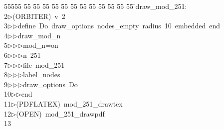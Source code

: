 %
%
\begin{tabbing}
55555 \= 55 \= 55 \= 55 \= 55 \= 55 \= 55 \= 55 \= 55 \= 55 \= 55 \= 55 \= 55 \= \>draw\_mod\_251:\\[0pt]
2\>$\triangleright$\>(ORBITER)\ v\ 2\ \\[0pt]
3\>$\triangleright$\>$\triangleright$\>define\ Do\ draw\_options\ nodes\_empty\ radius\ 10\ embedded\ end\ \\[0pt]
4\>$\triangleright$\>$\triangleright$\>draw\_mod\_n\ \\[0pt]
5\>$\triangleright$\>$\triangleright$\>$\triangleright$\>mod\_n=on\ \\[0pt]
6\>$\triangleright$\>$\triangleright$\>$\triangleright$\>n\ 251\ \\[0pt]
7\>$\triangleright$\>$\triangleright$\>$\triangleright$\>file\ mod\_251\ \\[0pt]
8\>$\triangleright$\>$\triangleright$\>$\triangleright$\>label\_nodes\ \\[0pt]
9\>$\triangleright$\>$\triangleright$\>$\triangleright$\>draw\_options\ Do\ \\[0pt]
10\>$\triangleright$\>$\triangleright$\>end\\[0pt]
11\>$\triangleright$\>(PDFLATEX)\ mod\_251\_drawtex\\[0pt]
12\>$\triangleright$\>(OPEN)\ mod\_251\_drawpdf\\[0pt]
13\>\end{tabbing}
